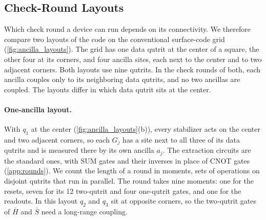 \subsection{Check-Round Layouts}
\label{sub:ancilla_layouts}

Which check round a device can run depends on its connectivity. We therefore compare two layouts of the code on the conventional surface-code grid (\autoref{fig:ancilla_layouts}). The grid has one data qutrit at the center of a square, the other four at its corners, and four ancilla sites, each next to the center and to two adjacent corners. Both layouts use nine qutrits. In the check rounds of both, each ancilla couples only to its neighboring data qutrits, and no two ancillas are coupled. The layouts differ in which data qutrit sits at the center.



\paragraph{One-ancilla layout.} With $q_1$ at the center (\autoref{fig:ancilla_layouts}(b)), every stabilizer acts on the center and two adjacent corners, so each $G_j$ has a site next to all three of its data qutrits and is measured there by its own ancilla $a_j$. The extraction circuits are the standard ones, with SUM gates and their inverses in place of CNOT gates (\autoref{app:rounds}). We count the length of a round in moments, sets of operations on disjoint qutrits that run in parallel. The round takes nine moments: one for the resets, seven for its 12 two-qutrit and four one-qutrit gates, and one for the readouts. In this layout $q_2$ and $q_3$ sit at opposite corners, so the two-qutrit gates of $\bar H$ and $\bar S$ need a long-range coupling.

